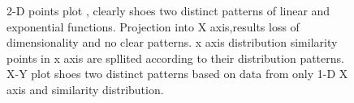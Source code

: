 \documentclass[a4paper]{article}
\begin{document}
\begin{figure}[ht]
\centering
{}
\caption[Optional caption for list of figures]
{ 2-D points plot , clearly shoes two distinct patterns 
of linear and exponential functions.
 Projection into X axis,results loss of dimensionality 
and no clear patterns.
 x axis distribution similarity
 points in x axis are spllited according to their distribution patterns.
 X-Y plot shoes  two distinct patterns based on 
data from only 1-D X axis and similarity distribution.}
\end{figure}
\pagebreak
\end{document}
